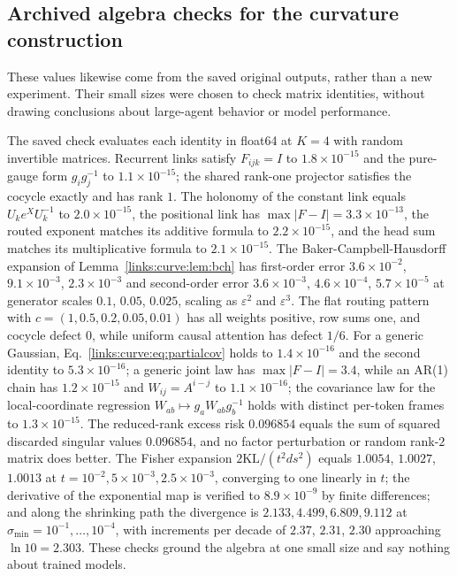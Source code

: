 \documentclass[11pt]{article}
\theoremstyle{definition}
\theoremstyle{remark}
\begin{document}
\subsection{Archived algebra checks for the curvature construction}
\label{links:curve:sec:checks}

These values likewise come from the saved original outputs, rather than a new experiment. Their small sizes were chosen to check matrix identities, without drawing conclusions about large-agent behavior or model performance.

The saved check evaluates each identity in float64 at $K=4$ with random invertible matrices. Recurrent links satisfy $F_{ijk}=I$ to $1.8\times10^{-15}$ and the pure-gauge form $g_ig_j^{-1}$ to $1.1\times10^{-15}$; the shared rank-one projector satisfies the cocycle exactly and has rank $1$. The holonomy of the constant link equals $U_ke^{X}U_k^{-1}$ to $2.0\times10^{-15}$, the positional link has $\max|F-I|=3.3\times10^{-13}$, the routed exponent matches its additive formula to $2.2\times10^{-15}$, and the head sum matches its multiplicative formula to $2.1\times10^{-15}$. The Baker-Campbell-Hausdorff expansion of Lemma~\ref{links:curve:lem:bch} has first-order error $3.6\times10^{-2}$, $9.1\times10^{-3}$, $2.3\times10^{-3}$ and second-order error $3.6\times10^{-3}$, $4.6\times10^{-4}$, $5.7\times10^{-5}$ at generator scales $0.1$, $0.05$, $0.025$, scaling as $\varepsilon^2$ and $\varepsilon^3$. The flat routing pattern with $c=(1,0.5,0.2,0.05,0.01)$ has all weights positive, row sums one, and cocycle defect $0$, while uniform causal attention has defect $1/6$. For a generic Gaussian, Eq.~\eqref{links:curve:eq:partialcov} holds to $1.4\times10^{-16}$ and the second identity to $5.3\times10^{-16}$; a generic joint law has $\max|F-I|=3.4$, while an AR(1) chain has $1.2\times10^{-15}$ and $W_{ij}=A^{i-j}$ to $1.1\times10^{-16}$; the covariance law for the local-coordinate regression $W_{ab}\mapsto g_aW_{ab}g_b^{-1}$ holds with distinct per-token frames to $1.3\times10^{-15}$. The reduced-rank excess risk $0.096854$ equals the sum of squared discarded singular values $0.096854$, and no factor perturbation or random rank-$2$ matrix does better. The Fisher expansion $2\mathrm{KL}/(t^2ds^2)$ equals $1.0054$, $1.0027$, $1.0013$ at $t=10^{-2},5\times10^{-3},2.5\times10^{-3}$, converging to one linearly in $t$; the derivative of the exponential map is verified to $8.9\times10^{-9}$ by finite differences; and along the shrinking path the divergence is $2.133,4.499,6.809,9.112$ at $\sigma_{\min}=10^{-1},\dots,10^{-4}$, with increments per decade of $2.37$, $2.31$, $2.30$ approaching $\ln10=2.303$. These checks ground the algebra at one small size and say nothing about trained models.
\end{document}
